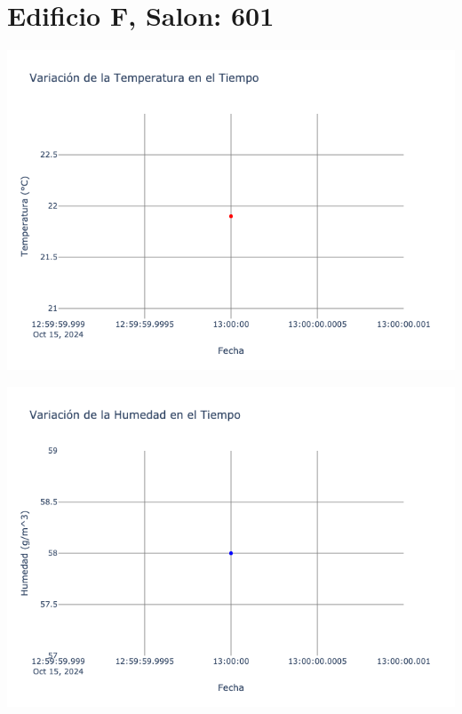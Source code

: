 \documentclass{article}
\begin{document}
    \section{Edificio F, Salon: 601}
    \noindent
    \begin{minipage}{0.48\textwidth}
        \centering
        \includegraphics[width=\textwidth]{../img/poli/TS601-90Dias-03-12-2024.png}
    \end{minipage}
    \hfill
    \begin{minipage}{0.48\textwidth}
        \centering
        \includegraphics[width=\textwidth]{../img/poli/HS601-90Dias-03-12-2024.png}
    \end{minipage}
\end{document}
